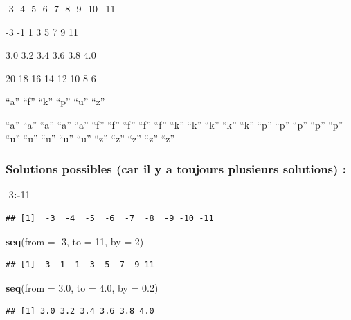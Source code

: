 \documentclass[]{book}
\newenvironment{Shaded}{\begin{snugshade}}{\end{snugshade}}
\newcommand{\DataTypeTok}[1]{\textcolor[rgb]{0.13,0.29,0.53}{#1}}
\newcommand{\DecValTok}[1]{\textcolor[rgb]{0.00,0.00,0.81}{#1}}
\newcommand{\FloatTok}[1]{\textcolor[rgb]{0.00,0.00,0.81}{#1}}
\newcommand{\KeywordTok}[1]{\textcolor[rgb]{0.13,0.29,0.53}{\textbf{#1}}}
\newcommand{\NormalTok}[1]{#1}
\newcommand{\OperatorTok}[1]{\textcolor[rgb]{0.81,0.36,0.00}{\textbf{#1}}}
\begin{document}
-3 -4 -5 -6 -7 -8 -9 -10 --11

-3 -1 1 3 5 7 9 11

3.0 3.2 3.4 3.6 3.8 4.0

20 18 16 14 12 10 8 6

``a'' ``f'' ``k'' ``p'' ``u'' ``z''

``a'' ``a'' ``a'' ``a'' ``a'' ``f'' ``f'' ``f'' ``f'' ``f'' ``k'' ``k'' ``k'' ``k'' ``k'' ``p'' ``p'' ``p'' ``p'' ``p'' ``u'' ``u'' ``u'' ``u'' ``u'' ``z'' ``z'' ``z'' ``z'' ``z''

\hypertarget{solutions-possibles-car-il-y-a-toujours-plusieurs-solutions}{%
\subsubsection{Solutions possibles (car il y a toujours plusieurs solutions) :}\label{solutions-possibles-car-il-y-a-toujours-plusieurs-solutions}}

\begin{Shaded}
\begin{Highlighting}[]
\DecValTok{-3}\OperatorTok{:-}\DecValTok{11}
\end{Highlighting}
\end{Shaded}

\begin{verbatim}
## [1]  -3  -4  -5  -6  -7  -8  -9 -10 -11
\end{verbatim}

\begin{Shaded}
\begin{Highlighting}[]
\KeywordTok{seq}\NormalTok{(}\DataTypeTok{from =} \DecValTok{-3}\NormalTok{, }\DataTypeTok{to =} \DecValTok{11}\NormalTok{, }\DataTypeTok{by =} \DecValTok{2}\NormalTok{)}
\end{Highlighting}
\end{Shaded}

\begin{verbatim}
## [1] -3 -1  1  3  5  7  9 11
\end{verbatim}

\begin{Shaded}
\begin{Highlighting}[]
\KeywordTok{seq}\NormalTok{(}\DataTypeTok{from =} \FloatTok{3.0}\NormalTok{, }\DataTypeTok{to =} \FloatTok{4.0}\NormalTok{, }\DataTypeTok{by =} \FloatTok{0.2}\NormalTok{)}
\end{Highlighting}
\end{Shaded}

\begin{verbatim}
## [1] 3.0 3.2 3.4 3.6 3.8 4.0
\end{verbatim}
\end{document}
